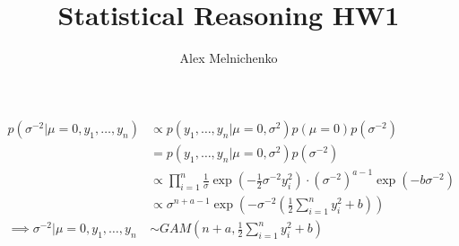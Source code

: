 \documentclass{article}\usepackage[]{graphicx}\usepackage[]{xcolor}
\title{Statistical Reasoning HW1}
\author{Alex Melnichenko}
\begin{document}
\maketitle

\section{}
    \subsection{}
        \begin{align*}
             p(\sigma^{-2}|\mu=0,y_1,\dots,y_n)&\propto p(y_1,\dots,y_n|\mu=0,\sigma^2)p(\mu=0)p(\sigma^{-2})\\
            &=p(y_1,\dots,y_n|\mu=0,\sigma^2)p(\sigma^{-2})\\
            &\propto \prod^n_{i=1}\frac{1}{\sigma}\exp\left(-\frac 12 \sigma^{-2}y_i^2\right)\cdot(\sigma^{-2})^{a-1}\exp(-b\sigma^{-2})\\
            &\propto \sigma^{n+a-1} \exp\left(-\sigma^{-2}\left(\frac 12 \sum_{i=1}^ny_i^2 + b\right)\right)\\
            \implies \sigma^{-2}|\mu=0,y_1,\dots,y_n&\sim GAM\left(n+a, \frac 12 \sum_{i=1}^ny_i^2 + b\right)
        \end{align*}
        
\end{document}
